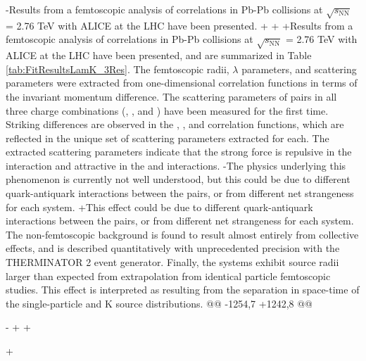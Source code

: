 -Results from a femtoscopic analysis of \LamK correlations in Pb-Pb collisions at $\sqrt{s_{\mathrm{NN}}}$ = 2.76 TeV with ALICE at the LHC have been presented.
+
+
+Results from a femtoscopic analysis of \LamK correlations in Pb-Pb collisions at $\sqrt{s_{\mathrm{NN}}}$ = 2.76 TeV with ALICE at the LHC have been presented, and are summarized in Table \ref{tab:FitResultsLamK_3Res}.
 The femtoscopic radii, $\lambda$ parameters, and scattering parameters were extracted from one-dimensional correlation functions in terms of the invariant momentum difference.
 The scattering parameters of \LamK pairs in all three charge combinations (\LamKchP, \LamKchM, and \LamKs) have been measured for the first time.
 Striking differences are observed in the \LamKchP, \LamKchM, and \LamKs correlation functions, which are reflected in the unique set of scattering parameters extracted for each.
 The extracted scattering parameters indicate that the strong force is repulsive in the \LamKchP interaction and attractive in the \LamKchM and \LamKs interactions.
-The physics underlying this phenomenon is currently not well understood, but this could be due to different quark-antiquark interactions between the pairs, or from different net strangeness for each system. 
+This effect could be due to different quark-antiquark interactions between the pairs, or from different net strangeness for each system. 
 The non-femtoscopic background is found to result almost entirely from collective effects, and is described quantitatively with unprecedented precision with the THERMINATOR 2 event generator.
 Finally, the \LamK systems exhibit source radii larger than expected from extrapolation from identical particle femtoscopic studies.
 This effect is interpreted as resulting from the separation in space-time of the single-particle \Lam and K source distributions.
@@ -1254,7 +1242,8 @@
 
 
 
-
+%
+\begin{comment}
 \section{Strong and Coulomb Fitter}
 \label{App:CoulombFitter}
 
@@ -1286,8 +1275,8 @@
 To build a fit function for a system including both strong and Coulomb interactions two related options were considered. 
 The first option was to numerically integrate Eq.\ \ref{eqn:KooninPrattEqn}.  
 The second option was to simulate a large sample of particle pairs, calculate the wave function describing the interaction, and average to obtain the integral in Eq.\ \ref{eqn:KooninPrattEqn}. 
-
-%
+\end{comment}
+%
 
 


